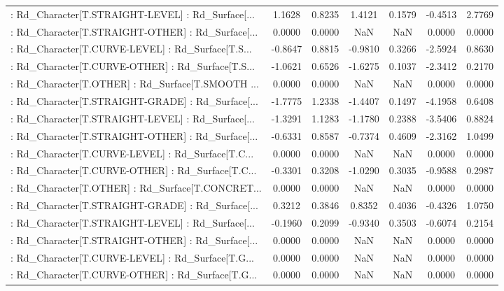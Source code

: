 \begin{longtable}{p{4cm}cccccc}
 : Rd\_Character[T.STRAIGHT-LEVEL] : Rd\_Surface[... &  1.1628 &    0.8235 &  1.4121 &       0.1579 & -0.4513 &  2.7769 \\
 : Rd\_Character[T.STRAIGHT-OTHER] : Rd\_Surface[... &  0.0000 &    0.0000 &     NaN &          NaN &  0.0000 &  0.0000 \\
 : Rd\_Character[T.CURVE-LEVEL] : Rd\_Surface[T.S... & -0.8647 &    0.8815 & -0.9810 &       0.3266 & -2.5924 &  0.8630 \\
 : Rd\_Character[T.CURVE-OTHER] : Rd\_Surface[T.S... & -1.0621 &    0.6526 & -1.6275 &       0.1037 & -2.3412 &  0.2170 \\
 : Rd\_Character[T.OTHER] : Rd\_Surface[T.SMOOTH ... &  0.0000 &    0.0000 &     NaN &          NaN &  0.0000 &  0.0000 \\
 : Rd\_Character[T.STRAIGHT-GRADE] : Rd\_Surface[... & -1.7775 &    1.2338 & -1.4407 &       0.1497 & -4.1958 &  0.6408 \\
 : Rd\_Character[T.STRAIGHT-LEVEL] : Rd\_Surface[... & -1.3291 &    1.1283 & -1.1780 &       0.2388 & -3.5406 &  0.8824 \\
 : Rd\_Character[T.STRAIGHT-OTHER] : Rd\_Surface[... & -0.6331 &    0.8587 & -0.7374 &       0.4609 & -2.3162 &  1.0499 \\
 : Rd\_Character[T.CURVE-LEVEL] : Rd\_Surface[T.C... &  0.0000 &    0.0000 &     NaN &          NaN &  0.0000 &  0.0000 \\
 : Rd\_Character[T.CURVE-OTHER] : Rd\_Surface[T.C... & -0.3301 &    0.3208 & -1.0290 &       0.3035 & -0.9588 &  0.2987 \\
 : Rd\_Character[T.OTHER] : Rd\_Surface[T.CONCRET... &  0.0000 &    0.0000 &     NaN &          NaN &  0.0000 &  0.0000 \\
 : Rd\_Character[T.STRAIGHT-GRADE] : Rd\_Surface[... &  0.3212 &    0.3846 &  0.8352 &       0.4036 & -0.4326 &  1.0750 \\
 : Rd\_Character[T.STRAIGHT-LEVEL] : Rd\_Surface[... & -0.1960 &    0.2099 & -0.9340 &       0.3503 & -0.6074 &  0.2154 \\
 : Rd\_Character[T.STRAIGHT-OTHER] : Rd\_Surface[... &  0.0000 &    0.0000 &     NaN &          NaN &  0.0000 &  0.0000 \\
 : Rd\_Character[T.CURVE-LEVEL] : Rd\_Surface[T.G... &  0.0000 &    0.0000 &     NaN &          NaN &  0.0000 &  0.0000 \\
 : Rd\_Character[T.CURVE-OTHER] : Rd\_Surface[T.G... &  0.0000 &    0.0000 &     NaN &          NaN &  0.0000 &  0.0000 \\

\end{longtable}

